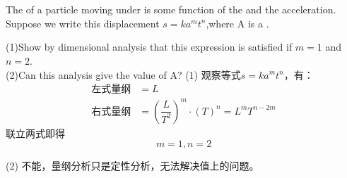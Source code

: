 \chapter[测量]{}
\begin{solution}[量纲分析]
	The  of a particle moving under  is some function of the  and
	the acceleration. Suppose we write this displacement
	$s=ka^mt^n$,where A is a . 
	
	\tcbrule
	
	(1)Show by
	dimensional analysis that this expression is satisfied if
	$m = 1$ and $n = 2$. \\
	(2)Can this analysis give the value of A?
	(1) 观察等式$s=ka^mt^n$，有：
	\begin{align*}
		\text{左式量纲}&=L\\
		\text{右式量纲}&=(\dfrac{L}{T^2})^m\cdot(T)^n=L^mT^{n-2m}
	\end{align*}
	联立两式即得
	\[m=1,n=2\]
	\par
	(2) 不能，量纲分析只是定性分析，无法解决值上的问题。
\end{solution}